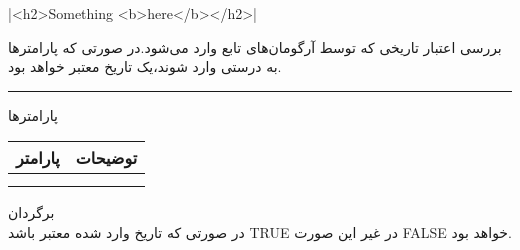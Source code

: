 |<h2>Something <b>here</b></h2>|

بررسی اعتبار تاریخی که توسط آرگومان‌های تابع وارد می‌شود.در صورتی که پارامترها به درستی وارد شوند،یک تاریخ معتبر خواهد بود.
\rule{\linewidth}{0.5mm}

پارامترها
\\
\begin{tabular}{|c|c|}
	\hline
	 پارامتر	& توضیحات \\
	\hline
	&  \\
	\hline
	&  \\
	\hline
\end{tabular}

برگردان
\\
در صورتی که تاریخ وارد شده معتبر باشد TRUE در غیر این صورت FALSE خواهد بود.

